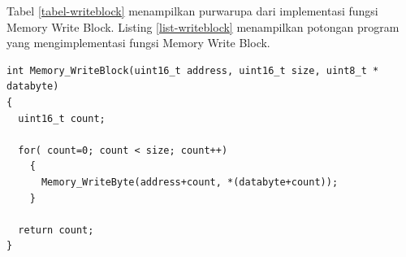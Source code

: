 Tabel \ref{tabel-writeblock} menampilkan purwarupa dari implementasi fungsi Memory Write Block. Listing \ref{list-writeblock} menampilkan potongan program yang mengimplementasi fungsi Memory Write Block.

\begin{lstlisting}[caption={Listing Program Fungsi Memory Write Block}, label={list-writeblock}]
int Memory_WriteBlock(uint16_t address, uint16_t size, uint8_t * databyte)
{
  uint16_t count;

  for( count=0; count < size; count++)
    {
      Memory_WriteByte(address+count, *(databyte+count));
    }

  return count;
}
\end{lstlisting}
